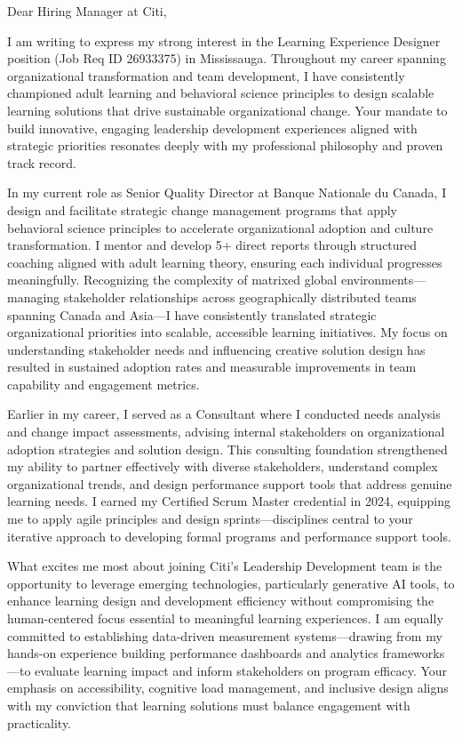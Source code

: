 Dear Hiring Manager at Citi,

I am writing to express my strong interest in the Learning Experience Designer position (Job Req ID 26933375) in Mississauga. Throughout my career spanning organizational transformation and team development, I have consistently championed adult learning and behavioral science principles to design scalable learning solutions that drive sustainable organizational change. Your mandate to build innovative, engaging leadership development experiences aligned with strategic priorities resonates deeply with my professional philosophy and proven track record.

In my current role as Senior Quality Director at Banque Nationale du Canada, I design and facilitate strategic change management programs that apply behavioral science principles to accelerate organizational adoption and culture transformation. I mentor and develop 5+ direct reports through structured coaching aligned with adult learning theory, ensuring each individual progresses meaningfully. Recognizing the complexity of matrixed global environments—managing stakeholder relationships across geographically distributed teams spanning Canada and Asia—I have consistently translated strategic organizational priorities into scalable, accessible learning initiatives. My focus on understanding stakeholder needs and influencing creative solution design has resulted in sustained adoption rates and measurable improvements in team capability and engagement metrics.

Earlier in my career, I served as a Consultant where I conducted needs analysis and change impact assessments, advising internal stakeholders on organizational adoption strategies and solution design. This consulting foundation strengthened my ability to partner effectively with diverse stakeholders, understand complex organizational trends, and design performance support tools that address genuine learning needs. I earned my Certified Scrum Master credential in 2024, equipping me to apply agile principles and design sprints—disciplines central to your iterative approach to developing formal programs and performance support tools.

What excites me most about joining Citi's Leadership Development team is the opportunity to leverage emerging technologies, particularly generative AI tools, to enhance learning design and development efficiency without compromising the human-centered focus essential to meaningful learning experiences. I am equally committed to establishing data-driven measurement systems—drawing from my hands-on experience building performance dashboards and analytics frameworks—to evaluate learning impact and inform stakeholders on program efficacy. Your emphasis on accessibility, cognitive load management, and inclusive design aligns with my conviction that learning solutions must balance engagement with practicality.

